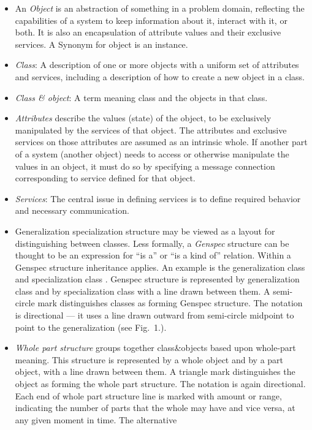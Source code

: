\begin{htmlonly}
\begin{center}
\begin{itemize}
\item
An {\em Object} is an abstraction of something in a problem domain, reflecting
the capabilities of a system to keep information about it, interact
with it, or both. It is also an encapsulation of attribute values and
their exclusive services. A Synonym for object is an instance.
\item
{\em Class}: A description of one or more objects with a uniform set of
attributes and services, including a description of how to create a new
object in a class.
\item
{\em Class \& object}: A term meaning class and the objects in that class. 
\item
{\em Attributes} describe the values (state) of the object, to be
exclusively manipulated by the services of that object. The attributes
and exclusive services on those attributes are assumed as an intrinsic
whole. If another part of a system (another object) needs to access or
otherwise manipulate the values in an object, it must do so by
specifying a message connection corresponding to service defined for
that object.
\item
{\em Services}: The central issue in defining services is to define required
behavior and necessary communication.
\item
Generalization specialization structure may be viewed as a layout for
distinguishing between classes.  Less formally, a {\em Genspec} structure
can be thought to be an expression for ``is a'' or ``is a kind of''
relation. Within a Genspec structure inheritance applies. An example
is the generalization class  and specialization class . Genspec structure is represented by generalization class
and by specialization class with a line drawn between them. A
semi-circle mark distinguishes classes as forming Genspec
structure. The notation is directional --- it uses a line drawn outward
from semi-circle midpoint to point to the generalization (see Fig.~1.). 
\item
{\em Whole part structure} groups together class\&objects based upon
whole-part meaning. This structure is represented by a whole object and
by a part object, with a line drawn between them. A triangle mark
distinguishes the object as forming the whole part structure. The notation is
again directional. Each end of whole part structure line is marked
with amount or range, indicating the number of parts that the whole may
have and vice versa, at any given moment in time. The alternative

\end{itemize}
\end{center}
\end{htmlonly}
